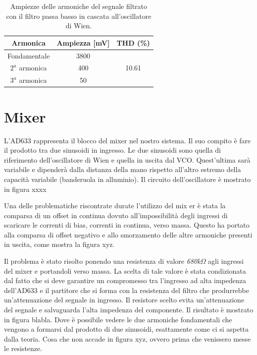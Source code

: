 \documentclass[titlepage]{report}
\begin{document}
	\begin{table}[h!]
		\centering
		\begin{tabular}{||c|c|c||}
			\hline
			\cellcolor{gray!10}Armonica & \cellcolor{gray!10}Ampiezza [mV] & \cellcolor{gray!10}THD (\%) \\
			\hline
			Fondamentale & 3800 &\\
			\cline{1-2}
			$2^a$ armonica & 400 & 10.61 \\
			\cline{1-2} 
			$3^a$ armonica & 50 & \\
			\hline	
		\end{tabular}
		\caption{Ampiezze delle armoniche del segnale filtrato con il filtro passa basso in cascata all'oscillatore di Wien.}
		\label{tab:THD_WIEN+LP}
	\end{table}

\section{Mixer}
\label{sec:Mixer}


L'AD633 rappresenta il blocco del mixer nel nostro sistema. Il suo compito è fare il prodotto tra due sinusoidi in ingresso. Le due sinusoidi sono quella di riferimento dell'oscillatore di Wien e quella in uscita dal VCO. Quest'ultima sarà variabile e dipenderà dalla distanza della mano rispetto all'altro estremo della capacità variabile (banderuola in alluminio). Il circuito dell'oscillatore è mostrato in figura xxxx


Una delle problematiche riscontrate durate l'utilizzo del mix er è stata la comparsa di un offset in continua dovuto all'impossibilità degli ingressi di scaricare le correnti di bias, correnti in continua, verso massa. Questo ha portato alla comparsa di offset negativo e allo smorzamento delle altre armoniche presenti in uscita, come mostra la figura xyz.



Il problema è stato risolto ponendo una resistenza di valore \textit{680k$\Omega$} agli ingressi del mixer e portandoli verso massa. La scelta di tale valore è stata condizionata dal fatto che si deve garantire un compromesso tra l'ingresso ad alta impedenza dell'AD633 e il partitore che si forma con la resistenza del filtro che produrrebbe un'attenuazione del segnale in ingresso. Il resistore scelto evita un'attenuazione del segnale e salvaguarda l'alta impedenza del componente. Il risultato è mostrato in figura blabla. Dove è possibile vedere le due armoniche fondamentali che vengono a formarsi dal prodotto di due sinusoidi, esattamente come ci si aspetta dalla teoria. Cosa che non accade in figura xyz, ovvero prima che venissero messe le resistenze.
	
\end{document}
